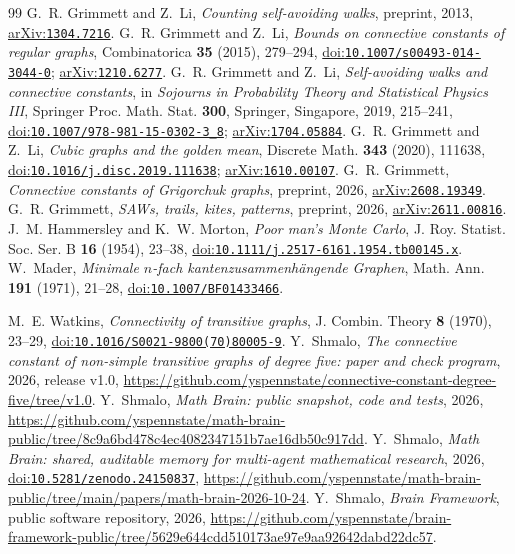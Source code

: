\documentclass[11pt]{amsart}
\theoremstyle{remark}
\newcommand{\doi}[1]{\href{https://doi.org/#1}{doi:\nolinkurl{#1}}}
\newcommand{\arxiv}[1]{\href{https://arxiv.org/abs/#1}{arXiv:\nolinkurl{#1}}}
\begin{document}
\begin{thebibliography}{99}
 G.~R. Grimmett and Z.~Li, \emph{Counting self-avoiding walks}, preprint, 2013, \arxiv{1304.7216}.
 G.~R. Grimmett and Z.~Li, \emph{Bounds on connective constants of regular graphs}, Combinatorica
\textbf{35} (2015), 279--294, \doi{10.1007/s00493-014-3044-0}; \arxiv{1210.6277}.
 G.~R. Grimmett and Z.~Li, \emph{Self-avoiding walks and connective constants}, in \emph{Sojourns in
Probability Theory and Statistical Physics III}, Springer Proc. Math. Stat. \textbf{300}, Springer, Singapore, 2019,
215--241, \doi{10.1007/978-981-15-0302-3_8}; \arxiv{1704.05884}.
 G.~R. Grimmett and Z.~Li, \emph{Cubic graphs and the golden mean}, Discrete Math. \textbf{343} (2020),
111638, \doi{10.1016/j.disc.2019.111638}; \arxiv{1610.00107}.
 G.~R. Grimmett, \emph{Connective constants of Grigorchuk graphs}, preprint, 2026, \arxiv{2608.19349}.
 G.~R. Grimmett, \emph{SAWs, trails, kites, patterns}, preprint, 2026, \arxiv{2611.00816}.
 J.~M. Hammersley and K.~W. Morton, \emph{Poor man's Monte Carlo}, J. Roy. Statist. Soc. Ser. B
\textbf{16} (1954), 23--38, \doi{10.1111/j.2517-6161.1954.tb00145.x}.
 W.~Mader, \emph{Minimale $n$-fach kantenzusammenh\"angende Graphen}, Math. Ann. \textbf{191} (1971),
21--28, \doi{10.1007/BF01433466}.

 M.~E. Watkins, \emph{Connectivity of transitive graphs}, J. Combin. Theory \textbf{8} (1970), 23--29,
\doi{10.1016/S0021-9800(70)80005-9}.
 Y.~Shmalo, \emph{The connective constant of non-simple transitive graphs of degree five: paper and
check program}, 2026, release v1.0,
\url{https://github.com/yspennstate/connective-constant-degree-five/tree/v1.0}.
 Y.~Shmalo, \emph{Math Brain: public snapshot, code and tests}, 2026,
\url{https://github.com/yspennstate/math-brain-public/tree/8c9a6bd478c4ec4082347151b7ae16db50c917dd}.
 Y.~Shmalo, \emph{Math Brain: shared, auditable memory for multi-agent mathematical
research}, 2026, \doi{10.5281/zenodo.24150837},
\url{https://github.com/yspennstate/math-brain-public/tree/main/papers/math-brain-2026-10-24}.
 Y.~Shmalo, \emph{Brain Framework}, public software repository, 2026,
\url{https://github.com/yspennstate/brain-framework-public/tree/5629e644cdd510173ae97e9aa92642dabd22dc57}.
\end{thebibliography}
\end{document}
